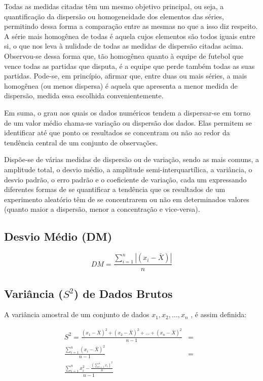 Todas as medidas citadas têm um mesmo objetivo principal, ou seja, a quantificação da dispersão ou homogeneidade dos elementos das séries, permitindo dessa forma a comparação entre as mesmas no que a isso diz respeito. A série mais homogênea de todas é aquela cujos elementos são todos iguais entre si, o que nos leva à nulidade de todas as medidas de dispersão citadas acima. Observou-se dessa forma que, tão homogênea quanto à equipe de futebol que vence todas as partidas que disputa, é a equipe que perde também todas as suas partidas. Pode-se, em princípio, afirmar que, entre duas ou mais séries, a mais homogênea (ou menos dispersa) é aquela que apresenta a menor medida de dispersão, medida essa escolhida convenientemente.\vskip0.3cm

Em suma, o grau aos quais os dados numéricos tendem a dispersar-se em torno de um valor médio chama-se variação ou dispersão dos dados. Elas permitem se identificar até que ponto os resultados se concentram ou não ao redor da tendência central de um conjunto de observações.\vskip0.3cm

Dispõe-se de várias medidas de dispersão ou de variação, sendo as mais comuns, a amplitude total, o desvio médio, a amplitude semi-interquartílica, a variância, o desvio padrão, o erro padrão e o coeficiente de variação, cada um expressando diferentes formas de se quantificar a tendência que os resultados de um experimento aleatório têm de se concentrarem ou não em determinados valores (quanto maior a dispersão, menor a concentração e vice-versa).




\subsection{Desvio Médio (DM)}

\begin{equation}\label{dn}
    DM=\frac{\sum_{i=1}^{n}|(x_{i}-\bar{X})|}{n}
\end{equation}

\newpage 

\subsection{Variância ($S^{2}$) de Dados Brutos}

A variância amostral de um conjunto de dados $x_{1},x_{2},\ldots,x_{n}$ , é assim definida:

\begin{eqnarray}\nonumber
S^{2}=\frac{(x_{1}-\bar{X})^{2}+(x_{2}-\bar{X})^{2}+\ldots+(x_{n}-\bar{X})^{2}}{n-1}
    & = &  \\
    \frac{\sum_{i=1}^{n}(x_{i}-\bar{X})^{2}}{n-1}& = &  \\ \nonumber
    \frac{\sum_{i=1}^{n}x_{i}^{2}-\frac{(\sum_{i=1}^{n}x_{i})^{2}}{n}}{n-1} &  &
\end{eqnarray}


